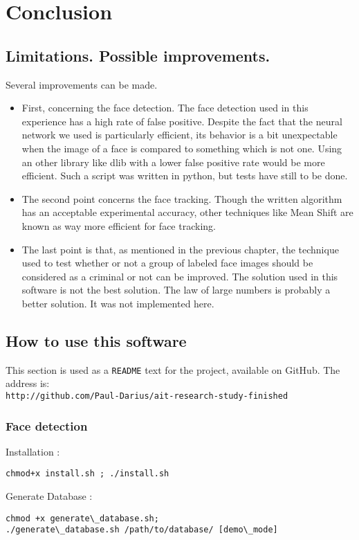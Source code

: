 \setlength{\footskip}{8mm}

\chapter{Conclusion}
\label{ch:conclusion}


\section{Limitations. Possible improvements.}
Several improvements can be made.
\begin{itemize}
\item First, concerning the face detection. The face detection used in this experience has a high rate of false positive. Despite the fact that the neural network we used is particularly efficient, its behavior is a bit unexpectable when the image of a face is compared to something which is not one. Using an other library like dlib with a lower false positive rate would be more efficient. Such a script was written in python, but tests have still to be done.
\item The second point concerns the face tracking. Though the written algorithm has an acceptable experimental accuracy, other techniques like Mean Shift are known as way more efficient for face tracking.
\item The last point is that, as mentioned in the previous chapter, the technique used to test whether or not a group of labeled face images should be considered as a criminal or not can be improved. The solution used in this software is not the best solution. The law of large numbers is probably a better solution. It was not implemented here.
\end{itemize}

\section{How to use this software}
This section is used as a \texttt{README} text for the project, available on GitHub. The address is:\\ \texttt{http://github.com/Paul-Darius/ait-research-study-finished}\newpage
\FloatBarrier

\subsection{Face detection}

Installation : 
\begin{verbatim}
chmod+x install.sh ; ./install.sh
\end{verbatim}
Generate Database : 
\begin{verbatim}
chmod +x generate\_database.sh;
./generate\_database.sh /path/to/database/ [demo\_mode]
\end{verbatim}


